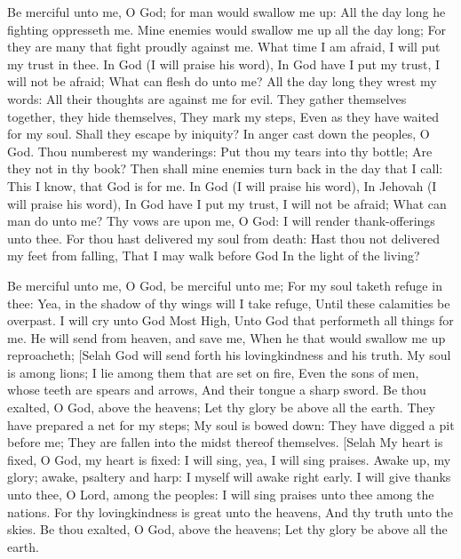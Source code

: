 Be merciful unto me, O God; for man would swallow me up: All the day long he fighting oppresseth me.  Mine enemies would swallow me up all the day long; For they are many that fight proudly against me.  What time I am afraid, I will put my trust in thee.  In God (I will praise his word), In God have I put my trust, I will not be afraid; What can flesh do unto me?  All the day long they wrest my words: All their thoughts are against me for evil.  They gather themselves together, they hide themselves, They mark my steps, Even as they have waited for my soul.  Shall they escape by iniquity? In anger cast down the peoples, O God.  Thou numberest my wanderings: Put thou my tears into thy bottle; Are they not in thy book?  Then shall mine enemies turn back in the day that I call: This I know, that God is for me.  In God (I will praise his word), In Jehovah (I will praise his word),  In God have I put my trust, I will not be afraid; What can man do unto me?  Thy vows are upon me, O God: I will render thank-offerings unto thee.  For thou hast delivered my soul from death: Hast thou not delivered my feet from falling, That I may walk before God In the light of the living? 

Be merciful unto me, O God, be merciful unto me; For my soul taketh refuge in thee: Yea, in the shadow of thy wings will I take refuge, Until these calamities be overpast.  I will cry unto God Most High, Unto God that performeth all things for me.  He will send from heaven, and save me, When he that would swallow me up reproacheth; [Selah God will send forth his lovingkindness and his truth.  My soul is among lions; I lie among them that are set on fire, Even the sons of men, whose teeth are spears and arrows, And their tongue a sharp sword.  Be thou exalted, O God, above the heavens; Let thy glory be above all the earth.  They have prepared a net for my steps; My soul is bowed down: They have digged a pit before me; They are fallen into the midst thereof themselves. [Selah  My heart is fixed, O God, my heart is fixed: I will sing, yea, I will sing praises.  Awake up, my glory; awake, psaltery and harp: I myself will awake right early.  I will give thanks unto thee, O Lord, among the peoples: I will sing praises unto thee among the nations.  For thy lovingkindness is great unto the heavens, And thy truth unto the skies.  Be thou exalted, O God, above the heavens; Let thy glory be above all the earth. 

